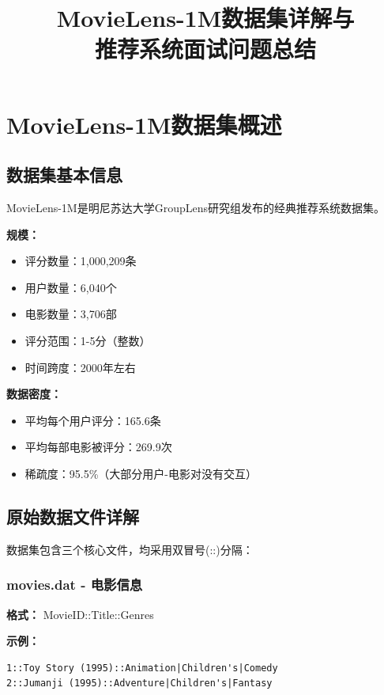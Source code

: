 \documentclass[12pt,a4paper]{article}
\title{\textbf{MovieLens-1M数据集详解与\\推荐系统面试问题总结}}
\author{}
\date{}
\begin{document}
\maketitle
\tableofcontents
\newpage

\section{MovieLens-1M数据集概述}

\subsection{数据集基本信息}

MovieLens-1M是明尼苏达大学GroupLens研究组发布的经典推荐系统数据集。

\textbf{规模：}
\begin{itemize}
    \item 评分数量：1,000,209条
    \item 用户数量：6,040个
    \item 电影数量：3,706部
    \item 评分范围：1-5分（整数）
    \item 时间跨度：2000年左右
\end{itemize}

\textbf{数据密度：}
\begin{itemize}
    \item 平均每个用户评分：165.6条
    \item 平均每部电影被评分：269.9次
    \item 稀疏度：95.5\%（大部分用户-电影对没有交互）
\end{itemize}

\subsection{原始数据文件详解}

数据集包含三个核心文件，均采用双冒号(::)分隔：

\subsubsection{movies.dat - 电影信息}

\textbf{格式：} MovieID::Title::Genres

\textbf{示例：}
\begin{lstlisting}
1::Toy Story (1995)::Animation|Children's|Comedy
2::Jumanji (1995)::Adventure|Children's|Fantasy
\end{lstlisting}
\end{document}
